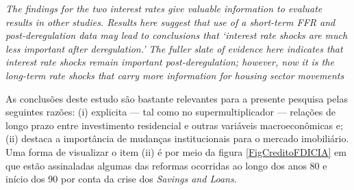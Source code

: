 \begin{citacao}
	\textit{The findings for the two interest rates give valuable information to evaluate results in
	other studies. Results here suggest that use of a short-term FFR and post-deregulation data
	may lead to conclusions that `interest rate shocks are much less important after
	deregulation.' The fuller slate of evidence here indicates that interest rate shocks remain
	important post-deregulation; however, now it is the long-term rate shocks that carry more
	information for housing sector movements} \cite[p.~346]{gauger_residential_2003}
\end{citacao}

As conclusões deste estudo são bastante relevantes para a presente pesquisa pelas seguintes razões: 
	(i) explicita --- tal como no supermultiplicador --- relações de longo prazo entre investimento residencial e outras variáveis macroeconômicas e; 
	(ii) destaca a importância de mudanças institucionais para o mercado imobiliário.
Uma forma de visualizar o item (ii) é por meio da figura \ref{FigCreditoFDICIA} em que estão assinaladas algumas das reformas ocorridas ao longo dos anos 80 e início dos 90 por conta da crise dos \textit{Savings and Loans}.
